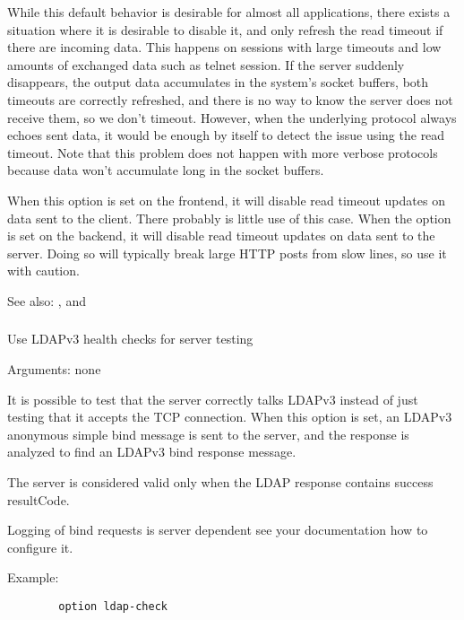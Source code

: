   While this default behavior is desirable for almost all applications, there
  exists a situation where it is desirable to disable it, and only refresh the
  read timeout if there are incoming data. This happens on sessions with large
  timeouts and low amounts of exchanged data such as telnet session. If the
  server suddenly disappears, the output data accumulates in the system's
  socket buffers, both timeouts are correctly refreshed, and there is no way
  to know the server does not receive them, so we don't timeout. However, when
  the underlying protocol always echoes sent data, it would be enough by itself
  to detect the issue using the read timeout. Note that this problem does not
  happen with more verbose protocols because data won't accumulate long in the
  socket buffers.

  When this option is set on the frontend, it will disable read timeout updates
  on data sent to the client. There probably is little use of this case. When
  the option is set on the backend, it will disable read timeout updates on
  data sent to the server. Doing so will typically break large HTTP posts from
  slow lines, so use it with caution.


See also: ,  and 

\subsubsection[ldap-check]{}


  Use LDAPv3 health checks for server testing


  Arguments: none

  It is possible to test that the server correctly talks LDAPv3 instead of just
  testing that it accepts the TCP connection. When this option is set, an
  LDAPv3 anonymous simple bind message is sent to the server, and the response
  is analyzed to find an LDAPv3 bind response message.

  The server is considered valid only when the LDAP response contains success resultCode.
  

  Logging of bind requests is server dependent see your documentation how to
  configure it.

  Example:
\begin{verbatim}
        option ldap-check
\end{verbatim}

